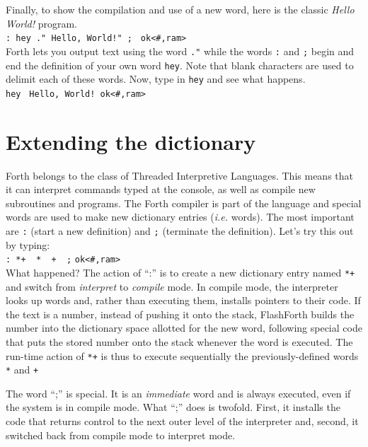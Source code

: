 \documentclass[12pt,a4paper]{article}
\begin{document}
\bigskip
Finally, to show the compilation and use of a new word,
here is the classic \textit{Hello World!} program. \vspace{7pt} \\
\verb?: hey ." Hello, World!" ; ? \fbox{$\hookleftarrow$} \verb!ok<#,ram>! \vspace{7pt} \\
Forth lets you output text using the word \verb!."! while the words \verb!:! and \verb!;!
begin and end the definition of your own word \verb!hey!.
Note that blank characters are used to delimit each of these words.
Now, type in \verb!hey! and see what happens. \vspace{7pt} \\
\verb!hey ! \fbox{$\hookleftarrow$} \verb?Hello, World! ok<#,ram>? \vspace{7pt}


\newpage
\section{Extending the dictionary}
\label{sec:dictionary}
%
Forth belongs to the class of Threaded Interpretive Languages.
This means that it can interpret commands typed at the console,
as well as compile new subroutines and programs.
The Forth compiler is part of the language and special words are
used to make new dictionary entries (\textit{i.e.} words).
The most important are \verb!:! (start a new definition) and
\verb!;! (terminate the definition).
Let's try this out by typing: \vspace{7pt} \\
\verb!: *+  *  +  ;! \fbox{$\hookleftarrow$} \verb!ok<#,ram>! \vspace{7pt} \\
What happened?
The action of ``:'' is to create a new dictionary entry named \verb!*+! and 
switch from \textit{interpret} to \textit{compile} mode.
In compile mode, the interpreter looks up words and, rather than executing them,
installs pointers to their code.
If the text is a number, instead of pushing it onto the stack, FlashForth builds
the number into the dictionary space allotted for the new word, 
following special code that puts the stored number onto the stack whenever the 
word is executed.
The run-time action of \verb!*+! is thus to execute sequentially the previously-defined words
\verb!*! and \verb!+!

\medskip
The word ``;'' is special.  
It is an \textit{immediate} word and is always executed, even if the system is in compile mode.
What ``;'' does is twofold.
First, it installs the code that returns control to the next outer level of the interpreter and,
second, it switched back from compile mode to interpret mode.
\end{document}
